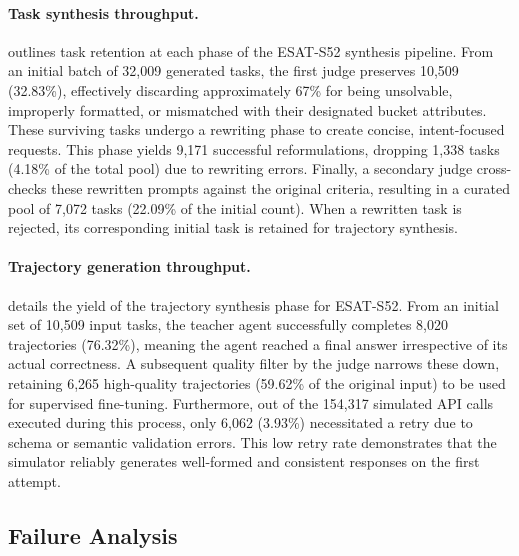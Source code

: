 \paragraph{Task synthesis throughput.}
 outlines task retention at each phase of the \textsc{ESAT}-S52 synthesis pipeline. From an initial batch of 32,009 generated tasks, the first judge preserves 10,509 (32.83\%), effectively discarding approximately 67\% for being unsolvable, improperly formatted, or mismatched with their designated bucket attributes. These surviving tasks undergo a rewriting phase to create concise, intent-focused requests. This phase yields 9,171 successful reformulations, dropping 1,338 tasks (4.18\% of the total pool) due to rewriting errors. Finally, a secondary judge cross-checks these rewritten prompts against the original criteria, resulting in a curated pool of 7,072 tasks (22.09\% of the initial count). When a rewritten task is rejected, its corresponding initial task is retained for trajectory synthesis.


\paragraph{Trajectory generation throughput.}
 details the yield of the trajectory synthesis phase for \textsc{ESAT}-S52. From an initial set of 10,509 input tasks, the teacher agent successfully completes 8,020 trajectories (76.32\%), meaning the agent reached a final answer irrespective of its actual correctness. A subsequent quality filter by the judge narrows these down, retaining 6,265 high-quality trajectories (59.62\% of the original input) to be used for supervised fine-tuning. Furthermore, out of the 154,317 simulated API calls executed during this process, only 6,062 (3.93\%) necessitated a retry due to schema or semantic validation errors. This low retry rate demonstrates that the simulator reliably generates well-formed and consistent responses on the first attempt.

\subsection{Failure Analysis}


